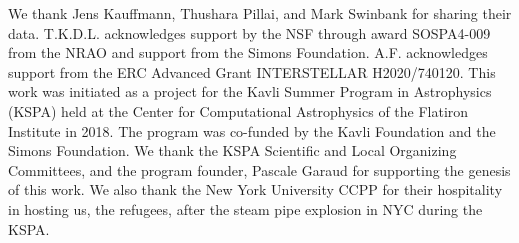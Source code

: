 \documentclass[apj]{emulateapj} %
\begin{document}
\acknowledgements

We thank Jens Kauffmann, Thushara Pillai, and Mark Swinbank for sharing their data.
T.K.D.L. acknowledges support by the NSF through award SOSPA4-009
from the NRAO and support from the Simons Foundation.
A.F. acknowledges support from the ERC Advanced Grant INTERSTELLAR H2020/740120.
This work was initiated as a project for the Kavli Summer Program in Astrophysics (KSPA) 
held at the Center for 
Computational Astrophysics of the Flatiron Institute in 2018. The program was co-funded by the Kavli 
Foundation and the Simons Foundation. 
We thank the KSPA Scientific and Local Organizing Committees, and the program founder, 
Pascale Garaud for supporting the genesis of this work. 
We also thank the New York University CCPP for their hospitality in hosting us, the refugees, after the steam pipe explosion in NYC during the KSPA.



\end{document}
